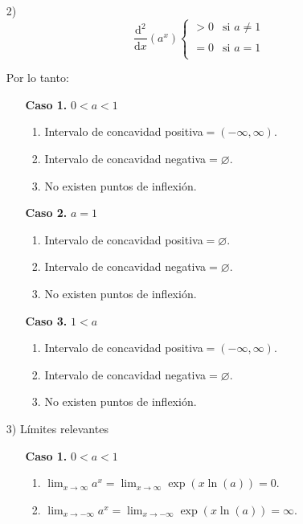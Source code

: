 \documentclass{article}
\numberwithin{equation}{section}
\newcommand{\limit}[2]{\lim_{#1\to #2}}
\newcommand{\limf}[1]{\lim_{#1\to\infty}}
\begin{document}
\begin{enumerate}
    \item[2)] $$ \frac{\mathrm{d^2}}{\mathrm{d}x} \left(  {a^x}  \right)  
    \left\{
        \begin{array}{ll}
            >0  & \mbox{si } a\neq 1 \\
            \\ =0 & \mbox{si } a=1 \\
        \end{array}
    \right.$$
    
    Por lo tanto:
    
    \begin{enumerate}
    
    \item[\textbf{Caso 1.}]  $0<a<1$
    \begin{enumerate}
    \item Intervalo de concavidad positiva$=(-\infty,\infty)$.
    \item Intervalo de concavidad negativa$=\varnothing$.
    \item No existen puntos de inflexión.
    \end{enumerate} 
    
    \item[\textbf{Caso 2.}]  $a=1$
    \begin{enumerate}
    \item Intervalo de concavidad positiva$=\varnothing$.
    \item Intervalo de concavidad negativa$=\varnothing$.
    \item No existen puntos de inflexión.
    \end{enumerate} 
    
    \item[\textbf{Caso 3.}]  $1<a$
    \begin{enumerate}
    \item Intervalo de concavidad positiva$=(-\infty,\infty)$.
    \item Intervalo de concavidad negativa$=\varnothing$.
    \item No existen puntos de inflexión.
    \end{enumerate} 
    
    \end{enumerate}
    
    \item[3)] Límites relevantes 
    
    \begin{enumerate}
    
    \item[\textbf{Caso 1.}]  $0<a<1$
    \begin{enumerate}
    \item $\limf{x}a^x=\limf{x}\exp(x\ln(a))=0$.
    \item $\limit{x}{-\infty}a^x=\limit{x}{-\infty}\exp(x\ln(a))=\infty$.
    \end{enumerate} 
    

\end{enumerate}
\end{enumerate}
\end{document}

